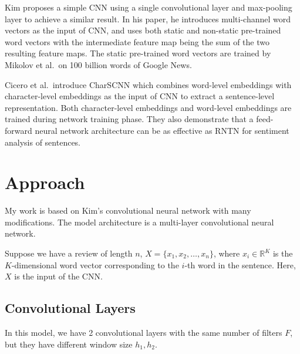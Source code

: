 \documentclass[11pt]{article}
\theoremstyle{definition}
\theoremstyle{basic}
\begin{document}
Kim\cite{kim2014convolutional} proposes a simple CNN using a single convolutional layer and max-pooling layer to achieve a similar result.
In his paper, he introduces multi-channel word vectors as the input of CNN, and uses both static and non-static pre-trained word vectors with the intermediate feature map being the sum of the two resulting feature maps.
The static pre-trained word vectors are trained by Mikolov et al.\ on 100 billion words of Google News\cite{DBLP:journals/corr/abs-1301-3781, DBLP:journals/corr/MikolovSCCD13}.



Cicero et al.\cite{dos2014deep}\ introduce CharSCNN which combines word-level embeddings with character-level embeddings as the input of CNN to extract a sentence-level representation. 
Both character-level embeddings and word-level embeddings are trained during network training phase.
They also demonstrate that a feed-forward neural network architecture can be as effective as RNTN for sentiment analysis of sentences.



\section{Approach}

My work is based on Kim's convolutional neural network with many modifications.
The model architecture is a multi-layer convolutional neural network.

Suppose we have a review of length $n$, $X = \{x_1, x_2, \ldots, x_n\}$, where $x_i \in \mathbb{R}^K$ is the $K$-dimensional word vector corresponding to the $i$-th word in the sentence.
Here, $X$ is the input of the CNN.

\subsection{Convolutional Layers}

In this model, we have 2 convolutional layers with the same number of filters $F$, but they have different window size $h_1, h_2$.
\end{document}
